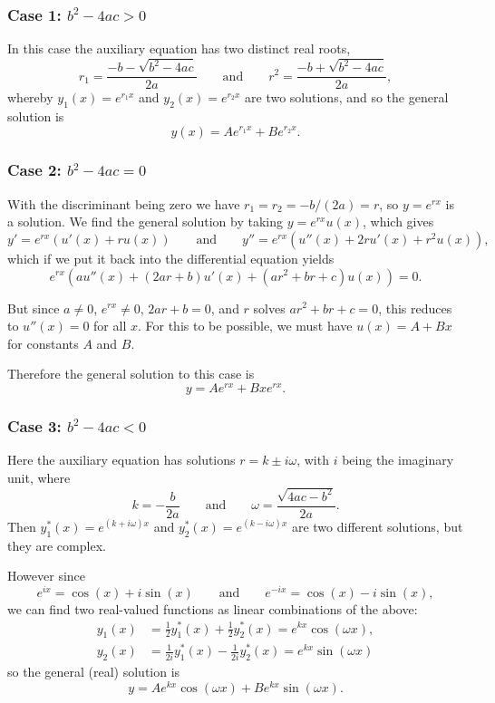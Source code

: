 \subsubsection*{Case 1: $b^2 - 4 a c > 0$}

In this case the auxiliary equation has two distinct real roots,
\[
	r_1 = \frac{- b - \sqrt{b^2 - 4 a c}}{2 a} \qquad \text{and} \qquad r^2 = \frac{- b + \sqrt{b^2 - 4 a c}}{2 a},
\]
whereby $y_1(x) = e^{r_1 x}$ and $y_2(x) = e^{r_2 x}$ are two solutions, and so the general solution is
\[
	y(x) = A e^{r_1 x} + B e^{r_2 x}.
\]

\subsubsection*{Case 2: $b^2 - 4 a c = 0$}

With the discriminant being zero we have $r_1 = r_2 = -b / (2a) = r$, so $y = e^{r x}$ is a solution.
We find the general solution by taking $y = e^{r x} u(x)$, which gives
\[
	y' = e^{r x} (u'(x) + r u(x)) \qquad \text{and} \qquad y'' = e^{r x} (u''(x) + 2 r u'(x) + r^2 u(x)),
\]
which if we put it back into the differential equation yields
\[
	e^{r x} (a u''(x) + (2 a r + b) u'(x) + (a r^2 + b r + c) u(x)) = 0.
\]

\noindent
But since $a \neq 0$, $e^{r x} \neq 0$, $2 a r + b = 0$, and $r$ solves $a r^2 + b r + c = 0$, this reduces to $u''(x) = 0$ for all $x$.
For this to be possible, we must have $u(x) = A + B x$ for constants $A$ and $B$.

Therefore the general solution to this case is
\[
	y = A e^{r x} + B x e^{r x}.
\]

\subsubsection*{Case 3: $b^2 - 4 a c < 0$}

Here the auxiliary equation has solutions $r = k \pm i \omega$, with $i$ being the imaginary unit, where
\[
	k = - \frac{b}{2 a} \qquad \text{and} \qquad \omega = \frac{\sqrt{4 a c - b^2}}{2 a}.
\]
Then $y_1^* (x) = e^{(k + i \omega) x}$ and $y_2^* (x) = e^{(k - i \omega) x}$ are two different solutions, but they are complex.

However since
\[
	e^{i x} = \cos(x) + i \sin(x) \qquad \text{and} \qquad e^{- i x} = \cos(x) - i \sin(x),
\]
we can find two real-valued functions as linear combinations of the above:
\begin{align*}
	y_1(x) &= \frac{1}{2} y_1^*(x) + \frac{1}{2} y_2^*(x) = e^{k x} \cos(\omega x), \\
	y_2(x) &= \frac{1}{2 i} y_1^*(x) - \frac{1}{2 i} y_2^*(x) = e^{k x} \sin(\omega x)
\end{align*}
so the general (real) solution is
\[
	y = A e^{k x} \cos(\omega x) + B e^{k x} \sin(\omega x).
\]

